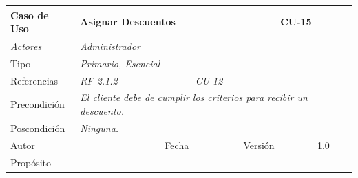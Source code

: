 \begin{table}[H]
    \begin{tabular}{|llllllll|}
    \hline
    \multicolumn{1}{|l|}{\cellcolor[HTML]{F2F2F2}Caso de Uso}           & \multicolumn{5}{l|}{Asignar Descuentos}                                                                       & \multicolumn{2}{l|}{\cellcolor[HTML]{E6E6E6}CU-15}             \\ \hline
    \multicolumn{1}{|l|}{{\color[HTML]{808080} \textit{Actores}}}       & \multicolumn{7}{l|}{{\color[HTML]{808080} \textit{Administrador}}}                                                                                                      \\ \hline
    \multicolumn{1}{|l|}{Tipo}                                          & \multicolumn{7}{l|}{{\color[HTML]{808080} \textit{Primario, Esencial}}}                                                                                                                           \\ \hline
    \multicolumn{1}{|l|}{Referencias}                                   & \multicolumn{2}{l|}{{\color[HTML]{808080} \textit{RF-2.1.2}}}                & \multicolumn{5}{l|}{{\color[HTML]{808080} \textit{CU-12}}}                                                                                                \\ \hline
    \multicolumn{1}{|l|}{Precondici\'on}                                  & \multicolumn{7}{l|}{{\color[HTML]{808080} \textit{El cliente debe de cumplir los criterios para recibir un descuento.}}}                                                                                                      \\ \hline
    \multicolumn{1}{|l|}{Poscondici\'on}                                  & \multicolumn{7}{l|}{{\color[HTML]{808080} \textit{Ninguna.}}}                                                                                                                                                                             \\ \hline
    \multicolumn{1}{|l|}{Autor}                                         & \multicolumn{1}{l|}{}                         & \multicolumn{2}{l|}{Fecha}             & \multicolumn{1}{l|}{}        & \multicolumn{2}{l|}{Versi\'on}             & 1.0                            \\ \hline
    \multicolumn{8}{|l|}{Prop\'osito}                                                                                                                                                                                                                                         \\ \hline

\end{tabular}
\end{table}
